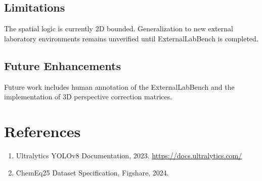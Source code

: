 \documentclass[12pt,a4paper]{report}
\begin{document}
\section{Limitations}
The spatial logic is currently 2D bounded. Generalization to new external laboratory environments remains unverified until ExternalLabBench is completed.

\section{Future Enhancements}
Future work includes human annotation of the ExternalLabBench and the implementation of 3D perspective correction matrices.

\chapter{References}
\begin{enumerate}
    \item Ultralytics YOLOv8 Documentation, 2023. \url{https://docs.ultralytics.com/}
    \item ChemEq25 Dataset Specification, Figshare, 2024.
\end{enumerate}
\end{document}
